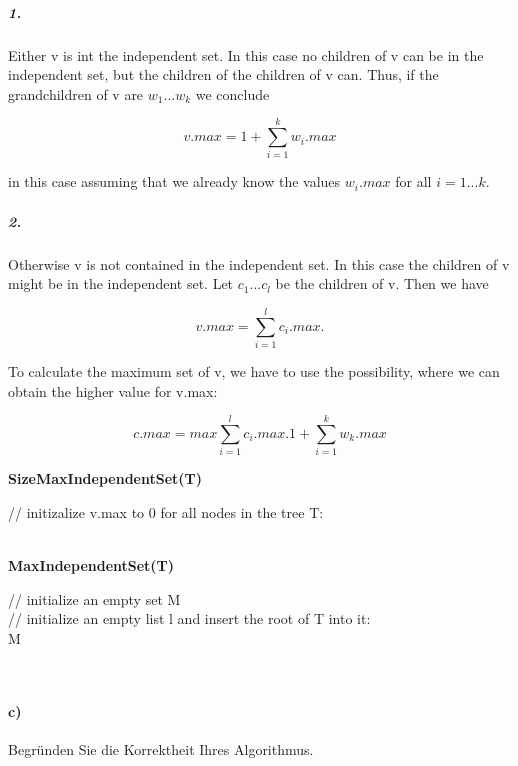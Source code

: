 \documentclass[paper=a4, fontsize=11pt]{scrartcl}
\numberwithin{equation}{section}
\numberwithin{figure}{section}
\numberwithin{table}{section}
\begin{document}
\subparagraph{1.}
Either v is int the independent set. In this case no children of v can be in the independent set, but the children of the children of v can. Thus, if the grandchildren of v are $w_{1} ... w_{k}$ we conclude

$$v.max=1+ \sum^{k}_{i=1} w_{i}.max$$

in this case assuming that we already know the values $w_{i}.max$ for all $i=1 ... k$.

\subparagraph{2.}
Otherwise v is not contained in the independent set. In this case the children of v might be in the independent set. Let $c_{1} ... c_{l}$ be the children of v. Then we have

$$v.max= \sum^{l}_{i=1}c_{i}.max.$$

To calculate the maximum set of v, we have to use the possibility, where we can obtain the higher value for v.max: 

$$c.max=max { \sum^{l}_{i=1} c_{i}.max.1 + \sum^{k}_{i=1} w_{k}.max}$$

\textbf{SizeMaxIndependentSet(T)} \\
\begin{algorithm}[H]
\SetAlgoLined
 // initizalize v.max to 0 for all nodes in the tree T: \\
\end{algorithm} \\

\textbf{MaxIndependentSet(T)} \\
\begin{algorithm}[H]
\SetAlgoLined
// initialize an empty set M \\
// initialize an empty list l and insert the root of T into it: \\
\Return M
\end{algorithm} \\

\paragraph{c)}
 Begründen Sie die Korrektheit Ihres Algorithmus. \\
 
\end{document}
